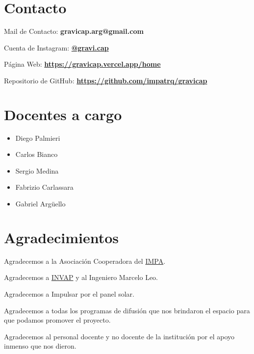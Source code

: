         \section{Contacto}
            Mail de Contacto: \textcolor{light_violet}{\textbf{gravicap.arg@gmail.com}}\par
            Cuenta de Instagram: \href{https://www.instagram.com/gravi.cap/}{ \textbf{@gravi.cap}}\par
            Página Web: \href{https://gravicap.vercel.app/home}{\textbf{https://gravicap.vercel.app/home}}\par
            Repositorio de GitHub: \href{https://github.com/impatrq/gravicap}{ \textbf{https://github.com/impatrq/gravicap}}\par
            
        \section{Docentes a cargo}
            \begin{itemize} [label=•]
                \setlength{\itemindent}{1.5em}
                    \item Diego Palmieri
                    \item Carlos Bianco
                    \item Sergio Medina
                    \item Fabrizio Carlassara
                    \item Gabriel Argüello
            \end{itemize}
                
        \section{Agradecimientos}
            Agradecemos a la Asociación Cooperadora del \href{https://www.impatrq.com}{IMPA}.\par
            Agradecemos a \href{https://www.invap.com.ar}{INVAP} y al Ingeniero Marcelo Leo.\par
            Agradecemos a Impulsar por el panel solar.\par
            Agradecemos a todas los programas de difusión que nos brindaron el espacio para que podamos promover el proyecto.\par
            Agradecemos al personal docente y no docente de la institución por el apoyo inmenso que nos dieron.\par

